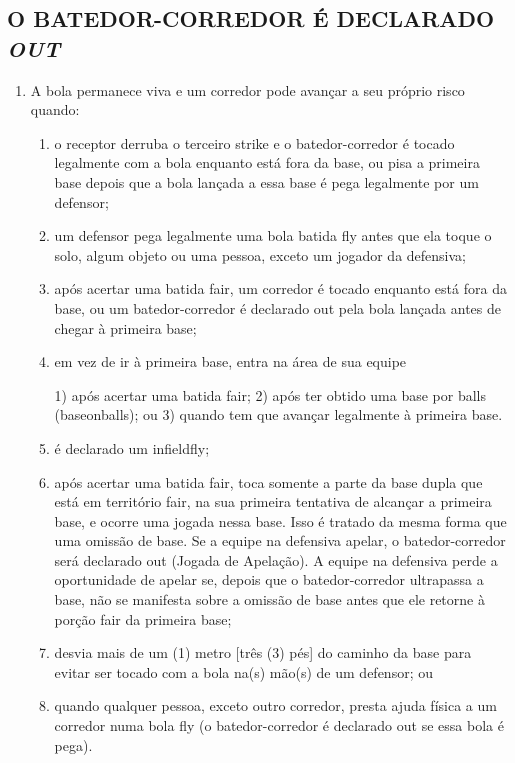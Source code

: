 \subsection{O BATEDOR-CORREDOR É DECLARADO \textit{OUT}}
\begin{enumerate}[label=(\alph*)]
	\item   A bola permanece viva e um corredor pode avançar a seu próprio risco quando:
	\begin{enumerate}[label=\roman*.]
		\item o receptor derruba o terceiro \gls{strike} e o batedor-corredor é tocado legalmente com a bola enquanto está fora da base, ou pisa a primeira base depois que a  bola lançada a essa base é pega legalmente por um defensor;
		\item um defensor pega legalmente uma bola batida \gls{fly} antes que ela toque o solo, algum objeto ou uma pessoa, exceto um jogador da defensiva;
		\item após acertar uma batida \gls{fair}, um corredor é tocado enquanto está fora da base, ou um batedor-corredor é declarado \gls{out} pela bola lançada antes de chegar à primeira base;
		\item em vez de ir à primeira base, entra na área de sua equipe

		1) após acertar uma batida \gls{fair};
		2) após ter obtido uma base por \glspl{ball} (\gls{baseonballs}); ou
		3) quando tem que avançar legalmente à primeira base.

		\item  é declarado um \gls{infieldfly};
		\item  após acertar uma batida \gls{fair}, toca somente a parte da base dupla que está em território \gls{fair}, na sua primeira tentativa de alcançar a primeira base, e ocorre uma jogada nessa base. Isso é tratado da mesma forma que uma omissão de base. Se a equipe na defensiva apelar, o batedor-corredor será declarado \gls{out} (Jogada de Apelação). A equipe na defensiva perde a oportunidade de apelar se, depois que o batedor-corredor ultrapassa a base, não se manifesta sobre a omissão de base antes que ele retorne à porção \gls{fair} da primeira base;
		\item  desvia mais de um (1) metro [três (3) pés] do caminho da base para evitar ser tocado com a bola na(s) mão(s) de um defensor; ou
		\item  quando qualquer pessoa, exceto outro corredor, presta ajuda física a um corredor numa bola \gls{fly} (o batedor-corredor é declarado \gls{out} se essa bola é pega).
	\end{enumerate}


\end{enumerate}
